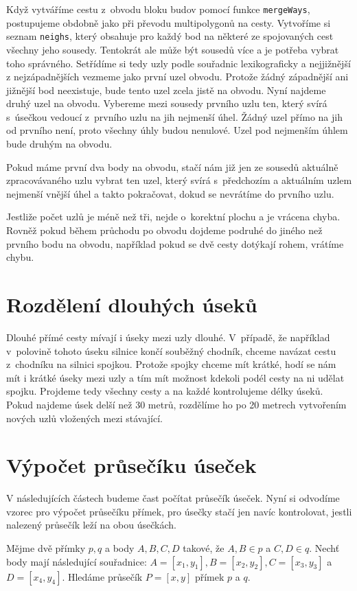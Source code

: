 Když vytváříme cestu z~obvodu bloku budov pomocí funkce \verb|mergeWays|,
postupujeme obdobně jako při převodu multipolygonů na cesty. Vytvoříme si seznam
\verb|neighs|, který obsahuje pro každý bod na některé ze spojovaných cest
všechny jeho sousedy. Tentokrát ale může být sousedů více a je potřeba vybrat
toho správného. Setřídíme si tedy uzly podle souřadnic lexikograficky a
nejjižnější z nejzápadnějších vezmeme jako první uzel obvodu.  Protože žádný
západnější ani jižnější bod neexistuje, bude tento uzel zcela jistě na obvodu.
Nyní najdeme druhý uzel na obvodu. Vybereme mezi sousedy prvního uzlu ten, který
svírá s~úsečkou vedoucí z~prvního uzlu na jih nejmenší úhel. Žádný uzel přímo na
jih od prvního není, proto všechny úhly budou nenulové. Uzel pod nejmenším úhlem
bude druhým na obvodu.

Pokud máme první dva body na obvodu, stačí nám již jen ze sousedů aktuálně
zpracovávaného uzlu vybrat ten uzel, který svírá s~předchozím a aktuálním uzlem
nejmenší vnější úhel a takto pokračovat, dokud se nevrátíme do prvního uzlu.

Jestliže počet uzlů je méně než tři, nejde o~korektní plochu a je vrácena chyba.
Rovněž pokud během průchodu po obvodu dojdeme podruhé do jiného než prvního bodu
na obvodu, například pokud se dvě cesty dotýkají rohem, vrátíme chybu.

\section{Rozdělení dlouhých úseků}
Dlouhé přímé cesty mívají i úseky mezi uzly dlouhé. V~případě, že například
v~polovině tohoto úseku silnice končí souběžný chodník, chceme navázat cestu
z~chodníku na silnici spojkou. Protože spojky chceme mít krátké, hodí se nám mít i
krátké úseky mezi uzly a tím mít možnost kdekoli podél cesty na ni udělat
spojku. Projdeme tedy všechny cesty a na každé kontrolujeme délky úseků. Pokud
najdeme úsek delší než 30 metrů, rozdělíme ho po 20 metrech vytvořením nových
uzlů vložených mezi stávající.

\section{Výpočet průsečíku úseček}
V následujících částech budeme čast počítat průsečík úseček. Nyní si odvodíme
vzorec pro výpočet průsečíku přímek, pro úsečky stačí jen navíc kontrolovat,
jestli nalezený průsečík leží na obou úsečkách.


Mějme dvě přímky $p,q$ a body $A,B,C,D$ takové, že $A,B \in p$ a $C,D \in q$.
Nechť body mají následující souřadnice: $A=[x_1,y_1], B=[x_2,y_2], C=[x_3,y_3]$
a $D=[x_4,y_4]$. Hledáme průsečík $P = [x,y]$ přímek $p$ a $q$.

